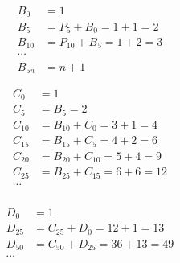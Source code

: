 \documentclass[10pt]{book}
\begin{document}
\begin{mdSnippets}
\newcommand{\Z}{\mathbb{Z}}

\begin{mdDisplaySnippet}%
  \begin{align*}
    B_0 &= 1 \\
    B_5 &= P_5 + B_0 = 1 + 1 = 2\\ 
    B_{10} &= P_{10} + B_5 = 1 + 2 = 3\\
    \cdots&\\
    B_{5 n} & = n + 1
  \end{align*}\end{mdDisplaySnippet}%
\begin{mdDisplaySnippet}[38891598712d24475793c29299bbd43b]%
  \begin{align*}
    C_0 &= 1 \\
    C_5 &= B_5 = 2\\ 
    C_{10} &= B_{10} + C_0 = 3 + 1 = 4\\
    C_{15} &= B_{15} + C_5 = 4 + 2 = 6\\
    C_{20} &= B_{20} + C_{10} = 5 + 4 = 9\\
    C_{25} &= B_{25} + C_{15} = 6 + 6 = 12\\
    \cdots&\\
  \end{align*}\end{mdDisplaySnippet}%
\begin{mdDisplaySnippet}[77d3190e6f7721cd1b395beba0af3710]%
  \begin{align*}
    D_0 &= 1 \\
    D_{25} &= C_{25} + D_{0} = 12 + 1 = 13\\ 
    D_{50} &= C_{50} + D_{25} = 36 + 13 = 49\\
    \cdots&\\
  \end{align*}\end{mdDisplaySnippet}%

\end{mdSnippets}
\end{document}
